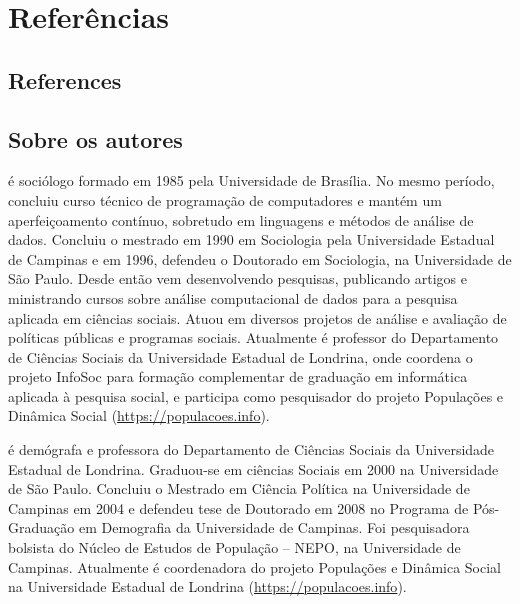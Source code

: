 \documentclass[
  brazilian,
  11pt,
  a4paper,
  open = right,
  twoside = true]{scrbook}
\providecommand{\tightlist}{%
  \setlength{\itemsep}{0pt}\setlength{\parskip}{0pt}}
\begin{document}
\part{Referências}

\chapter*{References}\label{references}


\protect{}\label{refs}

\chapter*{Sobre os autores}\label{sobre-os-autores}


\begin{description}
\tightlist
\item[Ronaldo Baltar]
é sociólogo formado em 1985 pela Universidade de Brasília. No mesmo
período, concluiu curso técnico de programação de computadores e mantém
um aperfeiçoamento contínuo, sobretudo em linguagens e métodos de
análise de dados. Concluiu o mestrado em 1990 em Sociologia pela
Universidade Estadual de Campinas e em 1996, defendeu o Doutorado em
Sociologia, na Universidade de São Paulo. Desde então vem desenvolvendo
pesquisas, publicando artigos e ministrando cursos sobre análise
computacional de dados para a pesquisa aplicada em ciências sociais.
Atuou em diversos projetos de análise e avaliação de políticas públicas
e programas sociais. Atualmente é professor do Departamento de Ciências
Sociais da Universidade Estadual de Londrina, onde coordena o projeto
InfoSoc para formação complementar de graduação em informática aplicada
à pesquisa social, e participa como pesquisador do projeto Populações e
Dinâmica Social (\url{https://populacoes.info}).
\item[Cláudia Siqueira Baltar]
é demógrafa e professora do Departamento de Ciências Sociais da
Universidade Estadual de Londrina. Graduou-se em ciências Sociais em
2000 na Universidade de São Paulo. Concluiu o Mestrado em Ciência
Política na Universidade de Campinas em 2004 e defendeu tese de
Doutorado em 2008 no Programa de Pós-Graduação em Demografia da
Universidade de Campinas. Foi pesquisadora bolsista do Núcleo de Estudos
de População -- NEPO, na Universidade de Campinas. Atualmente é
coordenadora do projeto Populações e Dinâmica Social na Universidade
Estadual de Londrina (\url{https://populacoes.info}).
\end{description}


\backmatter
\end{document}
